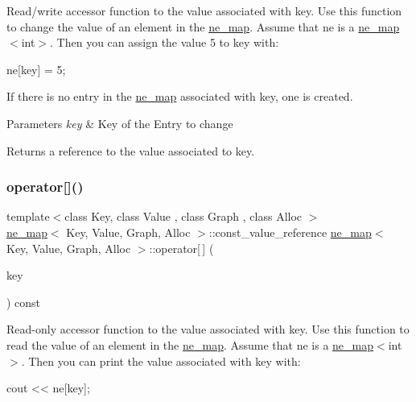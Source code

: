 Read/write accessor function to the value associated with {\ttfamily key}. Use this function to change the value of an element in the {\ttfamily \mbox{\hyperlink{classne__map}{ne\+\_\+map}}}. Assume that {\ttfamily ne} is a {\ttfamily \mbox{\hyperlink{classne__map}{ne\+\_\+map}}$<$int$>$}. Then you can assign the value 5 to {\ttfamily key} with\+: 
\begin{DoxyPre}
  ne[key] = 5;
\end{DoxyPre}


If there is no entry in the {\ttfamily \mbox{\hyperlink{classne__map}{ne\+\_\+map}}} associated with {\ttfamily key}, one is created.


\begin{DoxyParams}{Parameters}
{\em key} & Key of the Entry to change \\
\hline
\end{DoxyParams}
\begin{DoxyReturn}{Returns}
a reference to the value associated to {\ttfamily key}. 
\end{DoxyReturn}
\mbox{\label{classne__map_ad8d23cc924963ddff8267e625dcbffc6}} 
\subsubsection{\texorpdfstring{operator[]()}{operator[]()}\hspace{0.1cm}{\footnotesize\ttfamily [2/2]}}
{\footnotesize\ttfamily template$<$class Key, class Value , class Graph , class Alloc $>$ \\
\mbox{\hyperlink{classne__map}{ne\+\_\+map}}$<$ Key, Value, Graph, Alloc $>$\+::const\+\_\+value\+\_\+reference \mbox{\hyperlink{classne__map}{ne\+\_\+map}}$<$ Key, Value, Graph, Alloc $>$\+::operator\mbox{[}$\,$\mbox{]} (\begin{DoxyParamCaption}\item[{Key}]{key }\end{DoxyParamCaption}) const}

Read-\/only accessor function to the value associated with {\ttfamily key}. Use this function to read the value of an element in the {\ttfamily \mbox{\hyperlink{classne__map}{ne\+\_\+map}}}. Assume that {\ttfamily ne} is a {\ttfamily \mbox{\hyperlink{classne__map}{ne\+\_\+map}}$<$int$>$}. Then you can print the value associated with {\ttfamily key} with\+: 
\begin{DoxyPre}
  cout << ne[key];
\end{DoxyPre}



